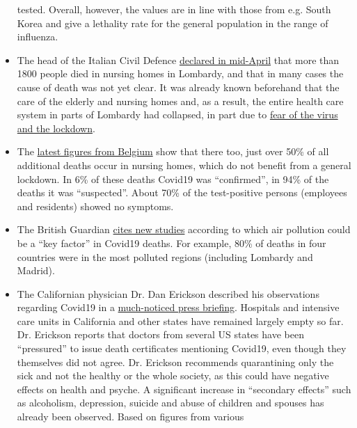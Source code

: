 \begin{itemize}
  tested. Overall, however, the values are in line with those from e.g.
  South Korea and give a lethality rate for the general population in
  the range of influenza.
\item
  The head of the Italian Civil Defence
  \href{https://www.theguardian.com/world/2020/apr/16/italian-police-broaden-care-home-coronavirus-milan}{declared
  in mid-April} that more than 1800 people died in nursing homes in
  Lombardy, and that in many cases the cause of death was not yet clear.
  It was already known beforehand that the care of the elderly and
  nursing homes and, as a result, the entire health care system in parts
  of Lombardy had collapsed, in part due to
  \href{https://swprs.org/covid-19-a-report-from-italy/}{fear of the
  virus and the lockdown}.
\item
  The
  \href{https://covid-19.sciensano.be/sites/default/files/Covid19/Meest\%20recente\%20update.pdf}{latest
  figures from Belgium} show that there too, just over 50\% of all
  additional deaths occur in nursing homes, which do not benefit from a
  general lockdown. In 6\% of these deaths Covid19 was ``confirmed'', in
  94\% of the deaths it was ``suspected''. About 70\% of the
  test-positive persons (employees and residents) showed no symptoms.
\item
  The British Guardian
  \href{https://www.theguardian.com/environment/2020/apr/20/air-pollution-may-be-key-contributor-to-covid-19-deaths-study?utm_medium}{cites
  new studies} according to which air pollution could be a ``key
  factor'' in Covid19 deaths. For example, 80\% of deaths in four
  countries were in the most polluted regions (including Lombardy and
  Madrid).
\item
  The Californian physician Dr. Dan Erickson described his observations
  regarding Covid19 in a
  \href{https://www.turnto23.com/news/coronavirus/video-interview-with-dr-dan-erickson-and-dr-artin-massihi-taken-down-from-youtube}{much-noticed
  press briefing}. Hospitals and intensive care units in California and
  other states have remained largely empty so far. Dr. Erickson reports
  that doctors from several US states have been ``pressured'' to issue
  death certificates mentioning Covid19, even though they themselves did
  not agree. Dr. Erickson recommends quarantining only the sick and not
  the healthy or the whole society, as this could have negative effects
  on health and psyche. A significant increase in ``secondary effects''
  such as alcoholism, depression, suicide and abuse of children and
  spouses has already been observed. Based on figures from various

\end{itemize}
